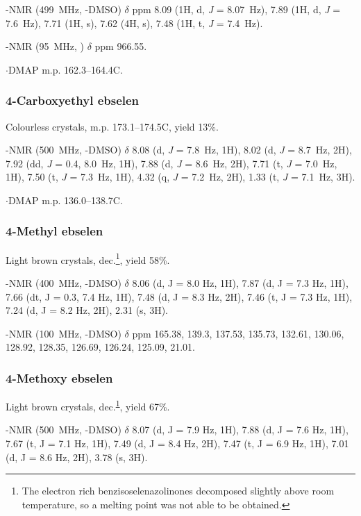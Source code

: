 \begin{refsection}
-NMR (499~MHz, -DMSO) $ \delta $ ppm 8.09 (1H, d, \textit{J} = 8.07~Hz), 7.89 (1H, d, \textit{J} = 7.6~Hz), 7.71 (1H, s), 7.62 (4H, s), 7.48 (1H, t, \textit{J} = 7.4~Hz).

-NMR (95~MHz, ) $\delta$ ppm 966.55.

$ \cdot $DMAP m.p. 162.3--164.4\degree{}C.


\subsubsection{4-Carboxyethyl ebselen }
Colourless crystals, m.p. 173.1--174.5\degree{}C, yield 13\%.\autocite{Bhabak2010}

-NMR (500~MHz, -DMSO) $ \delta $ 8.08 (d, \textit{J} = 7.8~Hz, 1H), 8.02 (d, \textit{J} = 8.7~Hz, 2H), 7.92 (dd, \textit{J} = 0.4, 8.0~Hz, 1H), 7.88 (d, \textit{J} = 8.6~Hz, 2H), 7.71 (t, \textit{J} = 7.0~Hz, 1H), 7.50 (t, \textit{J} = 7.3~Hz, 1H), 4.32 (q, \textit{J} = 7.2~Hz, 2H), 1.33 (t, \textit{J} = 7.1~Hz, 3H).

$ \cdot $DMAP m.p. 136.0--138.7\degree{}C.


\subsubsection{4-Methyl ebselen }
Light brown crystals, dec.\footnote{\label{fn:decompose} The electron rich benzisoselenazolinones decomposed slightly above room temperature, so a melting point was not able to be obtained.}, yield 58\%.\autocite{Weglarz-Tomczak2016}

-NMR (400~MHz, -DMSO) $ \delta $ 8.06 (d, J = 8.0 Hz, 1H), 7.87 (d, J = 7.3 Hz, 1H), 7.66 (dt, J = 0.3, 7.4 Hz, 1H), 7.48 (d, J = 8.3 Hz, 2H), 7.46 (t, J = 7.3 Hz, 1H), 7.24 (d, J = 8.2 Hz, 2H), 2.31 (s, 3H).

-NMR (100~MHz, -DMSO) $\delta$ ppm 165.38, 139.3, 137.53, 135.73, 132.61, 130.06, 128.92, 128.35, 126.69, 126.24, 125.09, 21.01.


\subsubsection{4-Methoxy ebselen }
Light brown crystals, dec.\textsuperscript{\ref{fn:decompose}}, yield 67\%.\autocite{Pacua2014}

-NMR (500~MHz, -DMSO) $ \delta $ 8.07 (d, J = 7.9 Hz, 1H), 7.88 (d, J = 7.6 Hz, 1H), 7.67 (t, J = 7.1 Hz, 1H), 7.49 (d, J = 8.4 Hz, 2H), 7.47 (t, J = 6.9 Hz, 1H), 7.01 (d, J = 8.6 Hz, 2H), 3.78 (s, 3H).



\end{refsection}
